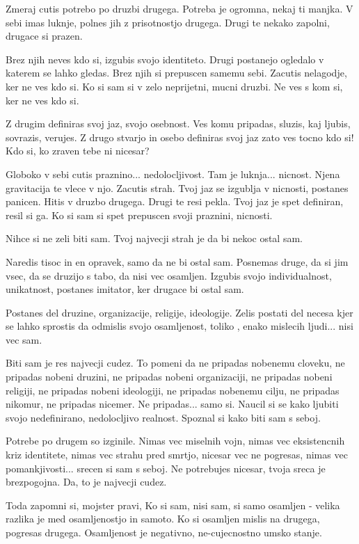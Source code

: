         

   Zmeraj cutis potrebo po druzbi drugega. Potreba je ogromna, nekaj ti manjka. V sebi imas luknje, polnes jih z prisotnostjo drugega. Drugi te nekako zapolni, drugace si prazen. 

Brez njih neves kdo si, izgubis svojo identiteto. Drugi postanejo ogledalo v katerem se lahko gledas. Brez njih si prepuscen samemu sebi. Zacutis nelagodje, ker ne ves kdo si. Ko si sam si v zelo neprijetni, mucni druzbi. Ne ves s kom si, ker ne ves kdo si. 

Z drugim definiras svoj jaz, svojo osebnost. Ves komu pripadas, sluzis, kaj ljubis, sovrazis, verujes. Z drugo stvarjo in osebo definiras svoj jaz zato ves tocno kdo si! Kdo si, ko zraven tebe ni nicesar? 

Globoko v sebi cutis praznino... nedolocljivost. Tam je luknja... nicnost. Njena gravitacija te vlece v njo. Zacutis strah. Tvoj jaz se izgublja v nicnosti, postanes panicen. Hitis v druzbo drugega. Drugi te resi pekla. Tvoj jaz je spet definiran, resil si ga. Ko si sam si spet prepuscen svoji praznini, nicnosti. 

Nihce si ne zeli biti sam. Tvoj najvecji strah je da bi nekoc ostal sam. 

Naredis tisoc in en opravek, samo da ne bi ostal sam. Posnemas druge, da si jim vsec, da se druzijo s tabo, da nisi vec osamljen. Izgubis svojo individualnost, unikatnost, postanes imitator, ker drugace bi ostal sam. 

Postanes del druzine, organizacije, religije, ideologije. Zelis postati del necesa kjer se lahko sprostis da odmislis svojo osamljenost, toliko , enako mislecih ljudi... nisi vec sam. 

Biti sam je res najvecji cudez. To pomeni da ne pripadas nobenemu cloveku, ne pripadas nobeni druzini, ne pripadas nobeni organizaciji, ne pripadas nobeni religiji, ne pripadas nobeni ideologiji, ne pripadas nobenemu cilju, ne pripadas nikomur, ne pripadas nicemer. Ne pripadas... samo si. Naucil si se kako ljubiti svojo nedefinirano, nedolocljivo realnost. Spoznal si kako biti sam s seboj. 

Potrebe po drugem so izginile. Nimas vec miselnih vojn, nimas vec eksistencnih kriz identitete, nimas vec strahu pred smrtjo, nicesar vec ne pogresas, nimas vec pomankjivosti... srecen si sam s seboj. Ne potrebujes nicesar, tvoja sreca je brezpogojna. Da, to je najvecji cudez. 

Toda zapomni si, mojster pravi,  Ko si sam, nisi sam, si samo osamljen - velika razlika je med osamljenostjo in samoto. Ko si osamljen mislis na drugega, pogresas drugega. Osamljenost je negativno, ne-cujecnostno umsko stanje. 

